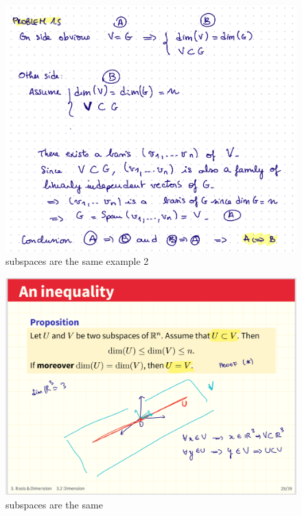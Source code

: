 \documentclass[12pt,twoside]{article}
\begin{document}
\begin{figure}[h]
    \centering
    \includegraphics[scale=.45]{screenshots/proof subspaces are the same example 2.png}
    \caption{subspaces are the same example 2}
    \label{fig:my_label}
\end{figure}

\begin{figure}[h]
    \centering
    \includegraphics[scale=.45]{screenshots/subspaces are the same.png}
    \caption{subspaces are the same}
    \label{fig:my_label}
\end{figure}
\end{document}
